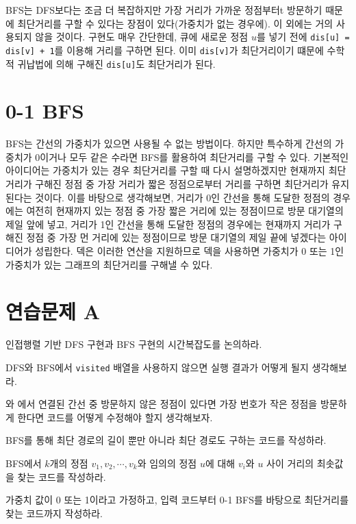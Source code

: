 BFS는 DFS보다는 조금 더 복잡하지만 가장 거리가 가까운 정점부터t 방문하기 때문에 최단거리를 구할 수 있다는 장점이 있다(가중치가 없는 경우에). 이 외에는 거의 사용되지 않을 것이다.
구현도 매우 간단한데, 큐에 새로운 정점 $u$를 넣기 전에 \texttt{dis[u] = dis[v] + 1}를 이용해 거리를 구하면 된다. 이미 \texttt{dis[v]}가 최단거리이기 떄문에 수학적 귀납법에 의해 구해진 \texttt{dis[u]}도 최단거리가 된다.

\section{0-1 BFS}
BFS는 간선의 가중치가 있으면 사용될 수 없는 방법이다. 하지만 특수하게 간선의 가중치가 0이거나 모두 같은 수라면 BFS를 활용하여 최단거리를 구할 수 있다.
기본적인 아이디어는 가중치가 있는 경우 최단거리를 구할 때 다시 설명하겠지만 현재까지 최단거리가 구해진 정점 중 가장 거리가 짧은 정점으로부터 거리를 구하면 최단거리가 유지된다는 것이다.
이를 바탕으로 생각해보면, 거리가 0인 간선을 통해 도달한 정점의 경우에는 여전히 현재까지 있는 정점 중 가장 짧은 거리에 있는 정점이므로 방문 대기열의 제일 앞에 넣고, 거리가 1인 간선을 통해 도달한 정점의 경우에는 현재까지 거리가 구해진 정점 중 가장 먼 거리에 있는 정점이므로 방문 대기열의 제일 끝에 넣겠다는 아이디어가 성립한다.
덱은 이러한 연산을 지원하므로 덱을 사용하면 가중치가 0 또는 1인 가중치가 있는 그래프의 최단거리를 구해낼 수 있다.

\section{연습문제 A}
\begin{problem}
    인접행렬 기반 DFS 구현과 BFS 구현의 시간복잡도를 논의하라.
\end{problem}
\begin{problem}
    DFS와 BFS에서 \texttt{visited} 배열을 사용하지 않으면 실행 결과가 어떻게 될지 생각해보라.
\end{problem}
\begin{problem}
    와 에서 연결된 간선 중 방문하지 않은 정점이 있다면 가장 번호가 작은 정점을 방문하게 한다면 코드를 어떻게 수정해야 할지 생각해보자.
\end{problem}
\begin{problem}
    BFS를 통해 최단 경로의 길이 뿐만 아니라 최단 경로도 구하는 코드를 작성하라.
\end{problem}
\begin{problem}
    BFS에서 $k$개의 정점 $v_1, v_2, \cdots, v_k$와 임의의 정점 $u$에 대해 $v_i$와 $u$ 사이 거리의 최솟값을 찾는 코드를 작성하라.
\end{problem}
\begin{problem}
    가중치 값이 0 또는 1이라고 가정하고, 입력 코드부터 0-1 BFS를 바탕으로 최단거리를 찾는 코드까지 작성하라.
\end{problem}

